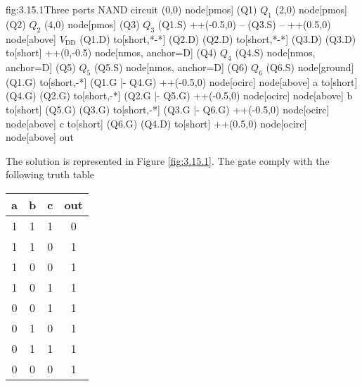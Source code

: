 \begin{circuit}{fig:3.15.1}{Three ports NAND circuit}
    (0,0) node[pmos] (Q1) {$Q_1$}
    (2,0) node[pmos] (Q2) {$Q_2$}
    (4,0) node[pmos] (Q3) {$Q_3$}
    (Q1.S) ++(-0.5,0) -- (Q3.S) -- ++(0.5,0)
    node[above] {$V_\text{DD}$}
    (Q1.D) to[short,*-*] (Q2.D)
    (Q2.D) to[short,*-*] (Q3.D)
    (Q3.D) to[short] ++(0,-0.5)
    node[nmos, anchor=D] (Q4) {$Q_4$}
    (Q4.S) node[nmos, anchor=D] (Q5) {$Q_5$}
    (Q5.S) node[nmos, anchor=D] (Q6) {$Q_6$}
    (Q6.S) node[ground] {}
    (Q1.G) to[short,-*] (Q1.G |- Q4.G)
    ++(-0.5,0)
    node[ocirc] {}
    node[above] {a}
    to[short] (Q4.G)
    (Q2.G) to[short,-*] (Q2.G |- Q5.G)
    ++(-0.5,0)
    node[ocirc] {}
    node[above] {b}
    to[short] (Q5.G)
    (Q3.G) to[short,-*] (Q3.G |- Q6.G)
    ++(-0.5,0)
    node[ocirc] {}
    node[above] {c}
    to[short] (Q6.G)
    (Q4.D) to[short] ++(0.5,0)
    node[ocirc] {}
    node[above] {out}
\end{circuit}
The solution is represented in Figure \ref{fig:3.15.1}. The gate comply with the following truth table
\begin{center}
\begin{tabular}{c c c | c}
    a & b & c & out \\
    \hline
    1 & 1 & 1 & 0 \\
    1 & 1 & 0 & 1 \\
    1 & 0 & 0 & 1 \\
    1 & 0 & 1 & 1 \\
    0 & 0 & 1 & 1 \\
    0 & 1 & 0 & 1 \\
    0 & 1 & 1 & 1 \\
    0 & 0 & 0 & 1 \\
\end{tabular}
\end{center}
